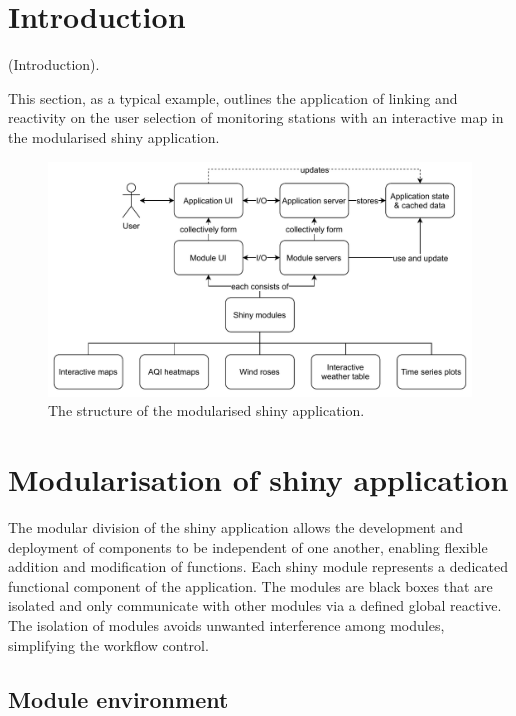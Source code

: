 \documentclass{aucklandthesis}
\begin{document}
\hypertarget{introduction-1}{%
\section{Introduction}\label{introduction-1}}

(Introduction).

This section, as a typical example, outlines the application of linking and reactivity on the user selection of monitoring stations with an interactive map in the modularised shiny application.

\begin{figure}
\includegraphics[width=1\linewidth]{figures/app-structure} \caption{The structure of the modularised shiny application.}\label{fig:unnamed-chunk-6}
\end{figure}



\hypertarget{modularisation-of-shiny-application}{%
\section{Modularisation of shiny application}\label{modularisation-of-shiny-application}}

The modular division of the shiny application allows the development and deployment of components to be independent of one another, enabling flexible addition and modification of functions. Each shiny module represents a dedicated functional component of the application. The modules are black boxes that are isolated and only communicate with other modules via a defined global reactive. The isolation of modules avoids unwanted interference among modules, simplifying the workflow control.

\hypertarget{module-environment}{%
\subsection{Module environment}\label{module-environment}}
\end{document}
